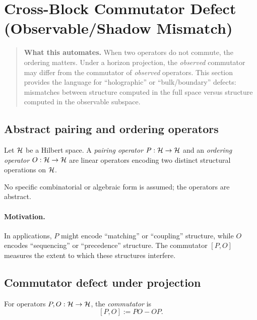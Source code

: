\section{Cross-Block Commutator Defect (Observable/Shadow Mismatch)}
\label{sec:holographic-defect}

\begin{quote}\small
\textbf{What this automates.}
When two operators do not commute, the ordering matters.
Under a horizon projection, the \emph{observed} commutator may differ from the commutator of \emph{observed} operators.
This section provides the language for ``holographic'' or ``bulk/boundary'' defects: mismatches between structure computed in the full space versus structure computed in the observable subspace.
\end{quote}

\subsection{Abstract pairing and ordering operators}

\begin{definition}
\label{def:pairing-ordering}
Let $\mathcal{H}$ be a Hilbert space.
A \emph{pairing operator} $P:\mathcal{H} \to \mathcal{H}$ and an \emph{ordering operator} $O:\mathcal{H} \to \mathcal{H}$ are linear operators encoding two distinct structural operations on $\mathcal{H}$.

No specific combinatorial or algebraic form is assumed; the operators are abstract.
\end{definition}

\paragraph{Motivation.}
In applications, $P$ might encode ``matching'' or ``coupling'' structure, while
$O$ encodes ``sequencing'' or ``precedence'' structure. The commutator $[P, O]$
measures the extent to which these structures interfere.

\subsection{Commutator defect under projection}

\begin{definition}[Commutator]
\label{def:commutator}
For operators $P, O:\mathcal{H} \to \mathcal{H}$, the \emph{commutator} is
\[
[P, O] := PO - OP.
\]
\end{definition}

